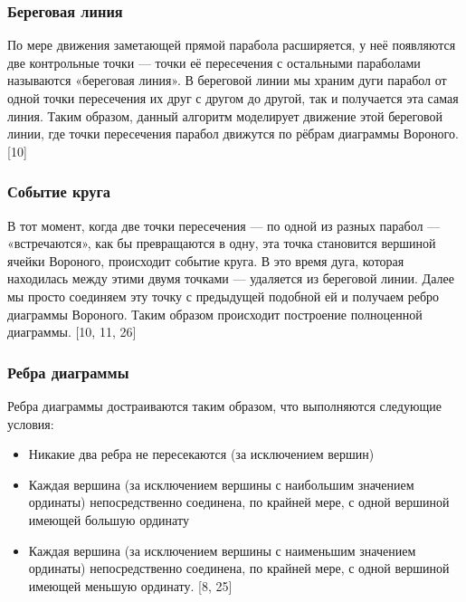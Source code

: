 \subsubsection{Береговая линия}
По мере движения заметающей прямой парабола расширяется, у неё появляются две контрольные точки — точки её пересечения с остальными параболами называются «береговая линия». В береговой линии мы храним дуги парабол от одной точки пересечения их друг с другом до другой, так и получается эта самая линия. Таким образом, данный алгоритм моделирует движение этой береговой линии, где точки пересечения парабол движутся по рёбрам диаграммы Вороного. [10]

\subsubsection{Событие круга}
В тот момент, когда две точки пересечения — по одной из разных парабол — «встречаются», как бы превращаются в одну, эта точка становится вершиной ячейки Вороного, происходит событие круга. В это время дуга, которая находилась между этими двумя точками —  удаляется из береговой линии. Далее мы просто соединяем эту точку с предыдущей подобной ей и получаем ребро диаграммы Вороного. Таким образом происходит построение полноценной диаграммы. [10, 11,  26]

\subsubsection{Ребра диаграммы}
Ребра диаграммы достраиваются таким образом, что выполняются следующие условия:
\begin{itemize}
\item Никакие два ребра не пересекаются (за исключением вершин)
\item Каждая вершина (за исключением вершины с наибольшим значением ординаты) непосредственно соединена, по крайней мере, с одной вершиной имеющей большую ординату
\item Каждая вершина (за исключением вершины с наименьшим значением ординаты) непосредственно соединена, по крайней мере, с одной вершиной имеющей меньшую ординату. [8, 25]
\end{itemize}

\clearpage

